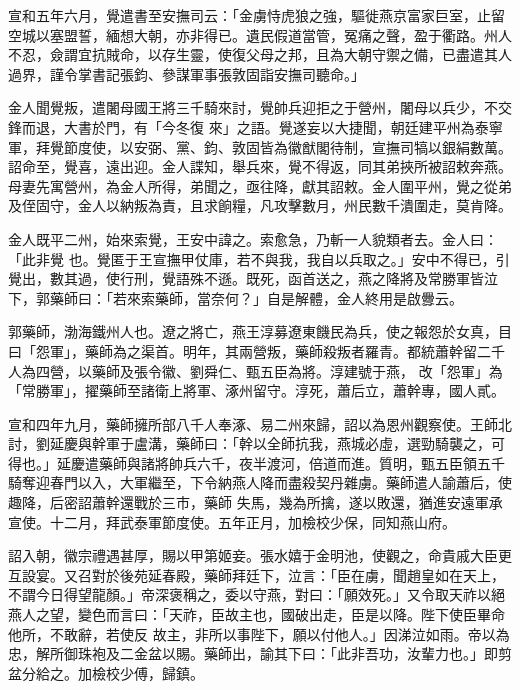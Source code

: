 \begin{pinyinscope}
 宣和五年六月，覺遣書至安撫司云：「金虜恃虎狼之強，驅徙燕京富家巨室，止留空城以塞盟誓，緬想大朝，亦非得已。遺民假道當管，冤痛之聲，盈于衢路。州人不忍，僉謂宜抗賊命，以存生靈，使復父母之邦，且為大朝守禦之備，已盡遣其人過界，謹令掌書記張鈞、參謀軍事張敦固詣安撫司聽命。」



 金人聞覺叛，遣闍母國王將三千騎來討，覺帥兵迎拒之于營州，闍母以兵少，不交鋒而退，大書於門，有「今冬復
 來」之語。覺遂妄以大捷聞，朝廷建平州為泰寧軍，拜覺節度使，以安弼、黨、鈞、敦固皆為徽猷閣待制，宣撫司犒以銀絹數萬。詔命至，覺喜，遠出迎。金人諜知，舉兵來，覺不得返，同其弟挾所被詔敕奔燕。母妻先寓營州，為金人所得，弟聞之，亟往降，獻其詔敕。金人圍平州，覺之從弟及侄固守，金人以納叛為責，且求餉糧，凡攻擊數月，州民數千潰圍走，莫肯降。



 金人既平二州，始來索覺，王安中諱之。索愈急，乃斬一人貌類者去。金人曰：「此非覺
 也。覺匿于王宣撫甲仗庫，若不與我，我自以兵取之。」安中不得已，引覺出，數其過，使行刑，覺語殊不遜。既死，函首送之，燕之降將及常勝軍皆泣下，郭藥師曰：「若來索藥師，當奈何？」自是解體，金人終用是啟釁云。



 郭藥師，渤海鐵州人也。遼之將亡，燕王淳募遼東饑民為兵，使之報怨於女真，目曰「怨軍」，藥師為之渠首。明年，其兩營叛，藥師殺叛者羅青。都統蕭幹留二千人為四營，以藥師及張令徽、劉舜仁、甄五臣為將。淳建號于燕，
 改「怨軍」為「常勝軍」，擢藥師至諸衛上將軍、涿州留守。淳死，蕭后立，蕭幹專，國人貳。



 宣和四年九月，藥師擁所部八千人奉涿、易二州來歸，詔以為恩州觀察使。王師北討，劉延慶與幹軍于盧溝，藥師曰：「幹以全師抗我，燕城必虛，選勁騎襲之，可得也。」延慶遣藥師與諸將帥兵六千，夜半渡河，倍道而進。質明，甄五臣領五千騎奪迎春門以入，大軍繼至，下令納燕人降而盡殺契丹雜虜。藥師遣人諭蕭后，使趣降，后密詔蕭幹還戰於三市，藥師
 失馬，幾為所擒，遂以敗還，猶進安遠軍承宣使。十二月，拜武泰軍節度使。五年正月，加檢校少保，同知燕山府。



 詔入朝，徽宗禮遇甚厚，賜以甲第姬妾。張水嬉于金明池，使觀之，命貴戚大臣更互設宴。又召對於後苑延春殿，藥師拜廷下，泣言：「臣在虜，聞趙皇如在天上，不謂今日得望龍顏。」帝深褒稱之，委以守燕，對曰：「願效死。」又令取天祚以絕燕人之望，變色而言曰：「天祚，臣故主也，國破出走，臣是以降。陛下使臣畢命他所，不敢辭，若使反
 故主，非所以事陛下，願以付他人。」因涕泣如雨。帝以為忠，解所御珠袍及二金盆以賜。藥師出，諭其下曰：「此非吾功，汝輩力也。」即剪盆分給之。加檢校少傅，歸鎮。




\end{pinyinscope}
